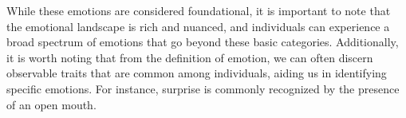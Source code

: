 While these emotions are considered foundational, it is important to note that the emotional landscape is rich and nuanced, and individuals can experience
a broad spectrum of emotions that go beyond these basic categories. 
Additionally, it is worth noting that from the definition of emotion, we can often discern observable traits that are common among individuals, aiding us in identifying specific emotions.
For instance, surprise is commonly recognized by the presence of an open mouth.